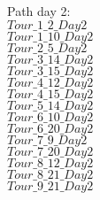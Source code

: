 Path day 2:\\
$Tour\_1\_2\_Day2$\\
$Tour\_1\_10\_Day2$\\
$Tour\_2\_5\_Day2$\\
$Tour\_3\_14\_Day2$\\
$Tour\_3\_15\_Day2$\\
$Tour\_4\_12\_Day2$\\
$Tour\_4\_15\_Day2$\\
$Tour\_5\_14\_Day2$\\
$Tour\_6\_10\_Day2$\\
$Tour\_6\_20\_Day2$\\
$Tour\_7\_9\_Day2$\\
$Tour\_7\_20\_Day2$\\
$Tour\_8\_12\_Day2$\\
$Tour\_8\_21\_Day2$\\
$Tour\_9\_21\_Day2$\\
